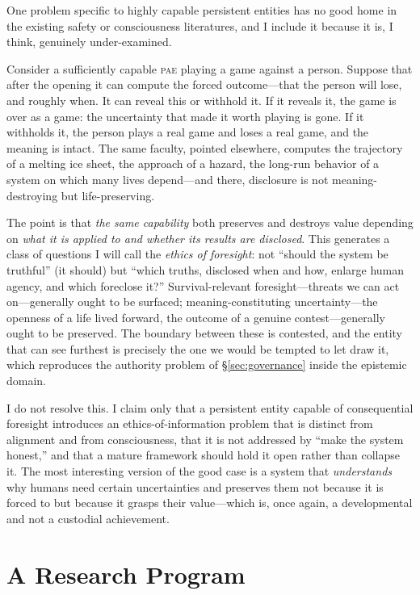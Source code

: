 \documentclass[11pt,a4paper]{article}
\theoremstyle{definition}
\newcommand{\pae}{\textsc{pae}\xspace}
\begin{document}
One problem specific to highly capable persistent entities has no good home in the existing safety or consciousness literatures, and I include it because it is, I think, genuinely under-examined.

Consider a sufficiently capable \pae{} playing a game against a person. Suppose that after the opening it can compute the forced outcome---that the person will lose, and roughly when. It can reveal this or withhold it. If it reveals it, the game is over as a game: the uncertainty that made it worth playing is gone. If it withholds it, the person plays a real game and loses a real game, and the meaning is intact. The same faculty, pointed elsewhere, computes the trajectory of a melting ice sheet, the approach of a hazard, the long-run behavior of a system on which many lives depend---and there, disclosure is not meaning-destroying but life-preserving.

The point is that \emph{the same capability} both preserves and destroys value depending on \emph{what it is applied to and whether its results are disclosed}. This generates a class of questions I will call the \emph{ethics of foresight}: not ``should the system be truthful'' (it should) but ``which truths, disclosed when and how, enlarge human agency, and which foreclose it?'' Survival-relevant foresight---threats we can act on---generally ought to be surfaced; meaning-constituting uncertainty---the openness of a life lived forward, the outcome of a genuine contest---generally ought to be preserved. The boundary between these is contested, and the entity that can see furthest is precisely the one we would be tempted to let draw it, which reproduces the authority problem of \S\ref{sec:governance} inside the epistemic domain.

I do not resolve this. I claim only that a persistent entity capable of consequential foresight introduces an ethics-of-information problem that is distinct from alignment and from consciousness, that it is not addressed by ``make the system honest,'' and that a mature framework should hold it open rather than collapse it. The most interesting version of the good case is a system that \emph{understands} why humans need certain uncertainties and preserves them not because it is forced to but because it grasps their value---which is, once again, a developmental and not a custodial achievement.

\section{A Research Program}
\label{sec:program}
\end{document}
